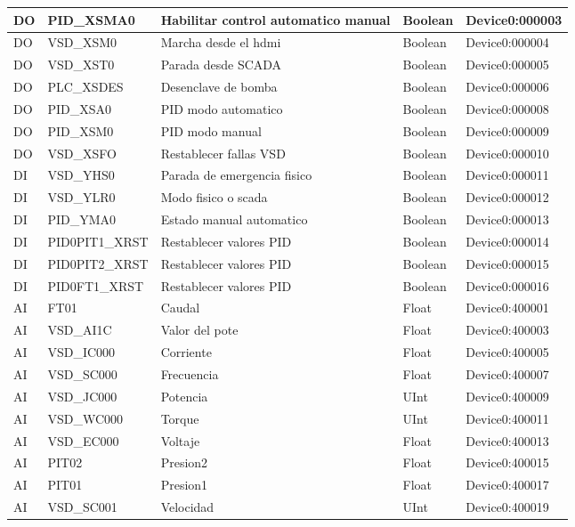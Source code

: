\begin{longtable}{|p{1.2cm} |p{4cm} |p{4cm} |p{1.5cm} |p{3.2cm} |}
	\endlastfoot
	

	DO & PID\_XSMA0 & Habilitar control automatico manual & Boolean & Device0:000003 \\ \hline
	DO & VSD\_XSM0 & Marcha desde el hdmi & Boolean & Device0:000004 \\ \hline
	DO & VSD\_XST0 & Parada desde SCADA & Boolean & Device0:000005 \\ \hline
	DO & PLC\_XSDES & Desenclave de bomba & Boolean & Device0:000006 \\ \hline
	DO & PID\_XSA0 & PID modo automatico & Boolean & Device0:000008 \\ \hline
	DO & PID\_XSM0 & PID modo manual & Boolean & Device0:000009 \\ \hline
	DO & VSD\_XSFO & Restablecer fallas VSD & Boolean & Device0:000010 \\ \hline
	DI & VSD\_YHS0 & Parada de emergencia fisico & Boolean & Device0:000011 \\ \hline
	DI & VSD\_YLR0 & Modo fisico o scada & Boolean & Device0:000012 \\ \hline
	DI & PID\_YMA0 & Estado manual automatico & Boolean & Device0:000013 \\ \hline
	DI & PID0PIT1\_XRST & Restablecer valores PID & Boolean & Device0:000014 \\ \hline
	DI & PID0PIT2\_XRST & Restablecer valores PID & Boolean & Device0:000015 \\ \hline
	DI & PID0FT1\_XRST & Restablecer valores PID& Boolean & Device0:000016 \\ \hline
	AI & FT01 & Caudal & Float & Device0:400001 \\ \hline
	AI & VSD\_AI1C & Valor del pote & Float & Device0:400003 \\ \hline
	AI & VSD\_IC000 & Corriente & Float & Device0:400005 \\ \hline
	AI & VSD\_SC000 & Frecuencia & Float & Device0:400007 \\ \hline
	AI & VSD\_JC000 & Potencia & UInt & Device0:400009 \\ \hline
	AI & VSD\_WC000 & Torque & UInt & Device0:400011 \\ \hline
	AI & VSD\_EC000 & Voltaje & Float & Device0:400013 \\ \hline
	AI & PIT02 & Presion2 & Float & Device0:400015 \\ \hline
	AI & PIT01 & Presion1 & Float & Device0:400017 \\ \hline
	AI & VSD\_SC001 & Velocidad & UInt & Device0:400019 \\ \hline

\end{longtable}
